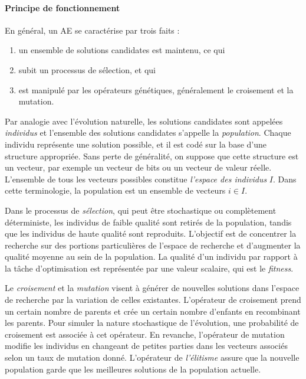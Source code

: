 \paragraph{Principe de fonctionnement}
En général, un AE se caractérise par trois faits :
\begin{enumerate}
 \item un ensemble de solutions candidates est maintenu, ce qui
 \item subit un processus de sélection, et qui
 \item est manipulé par les opérateurs génétiques, généralement le croisement et la mutation.
\end{enumerate}

Par analogie avec l'évolution naturelle, les solutions candidates sont appelées \textit{individus} et l'ensemble des solutions candidates s'appelle la \textit{population}. Chaque individu représente une solution possible, et il est codé sur la base d'une structure appropriée. Sans perte de généralité, on suppose que cette structure est un vecteur, par exemple un vecteur de bits ou un vecteur de valeur réelle. L'ensemble de tous les vecteurs possibles constitue \textit{l'espace des individus} $I$. Dans cette terminologie, la population est un ensemble de vecteurs $i \in I$.

Dans le processus de \textit{sélection}, qui peut être stochastique ou complètement déterministe, les individus de faible qualité sont retirés de la population, tandis que les individus de haute qualité sont reproduits. L'objectif est de concentrer la recherche sur des portions particulières de l'espace de recherche et d'augmenter la qualité moyenne au sein de la population. La qualité d'un individu par rapport à la tâche d'optimisation est représentée par une valeur scalaire, qui est le \textit{fitness}.

Le \textit{croisement} et la \textit{mutation} visent à générer de nouvelles solutions dans l'espace de recherche par la variation de celles existantes. L'opérateur de croisement prend un certain nombre de parents et crée un certain nombre d'enfants en recombinant les parents. Pour simuler la nature stochastique de l'évolution, une probabilité de croisement est associée à cet opérateur. En revanche, l'opérateur de mutation modifie les individus en changeant de petites parties dans les vecteurs associés selon un taux de mutation donné. L'opérateur de \textit{l'élitisme} assure que la nouvelle population garde que les meilleures solutions de la population actuelle.


